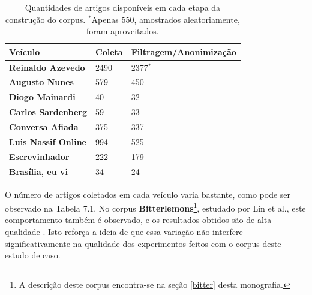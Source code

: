 \begin{table}[t]
\centering
\begin{tabular}{| l | l | p{5cm} | }
\hline

\textbf{Veículo} & \textbf{Coleta} & \textbf{Filtragem/Anonimização} \\ \hline

\textbf{Reinaldo Azevedo} & 2490 & 2377\ensuremath{^*} \\ \hline
\textbf{Augusto Nunes} & 579 & 450 \\ \hline
\textbf{Diogo Mainardi} & 40 & 32 \\ \hline
\textbf{Carlos Sardenberg} & 59 & 33  \\ \hline
\textbf{Conversa Afiada} & 375 & 337  \\ \hline
\textbf{Luis Nassif Online} & 994 & 525 \\ \hline
\textbf{Escrevinhador} & 222 & 179  \\ \hline
\textbf{Brasília, eu vi} & 34 & 24  \\ \hline
\end{tabular}
\label{tab1:estudo}
\caption{Quantidades de artigos disponíveis em cada etapa da construção do corpus. \ensuremath{^*}Apenas 550, amostrados aleatoriamente, foram aproveitados.}
\end{table}

O número de artigos coletados em cada veículo varia bastante, como pode ser observado na Tabela 7.1. No corpus \textbf{Bitterlemons}\footnote{A descrição deste corpus encontra-se na seção \ref{bitter} desta monografia.}, estudado por Lin et al., este comportamento também é observado, e os resultados obtidos são de alta qualidade \cite{lin-et-al2006}. Isto reforça a ideia de que essa variação não interfere significativamente na qualidade dos experimentos feitos com o corpus deste estudo de caso.



